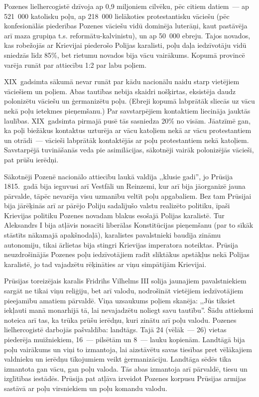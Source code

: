 \documentclass[twoside,a5paper,12pt,fleqn,openany]{extbook}
\begin{document}
Pozenes lielhercogistē dzīvoja ap 0,9 miljoniem cilvēku, pēc citiem datiem~--- ap 521~000 katolisku poļu, ap 218~000 lielākoties protestantisku vāciešu (pēc konfesionālās piederības Pozenes vāciešu vidū dominēja luterāņi, kaut pastāvēja arī maza grupiņa t.s. reformātu-kalvinistu), un ap 50~000 ebreju. Tajos novados, kas robežojās ar Krievijai piederošo Polijas karalisti, poļu daļa iedzīvotāju vidū sniedzās līdz 85\%, bet rietumu novados bija vācu vairākums. Kopumā provincē varēja runāt par attiecību 1:2 par labu poļiem.

XIX~gadsimta sākumā nevar runāt par kādu nacionālu naidu starp vietējiem vāciešiem un poļiem. Abas tautības nebija skaidri nošķirtas, eksistēja daudz polonizētu vāciešu un ģermanizētu poļu. (Ebreji kopumā labprātāk sliecās uz vācu nekā poļu ietekmes pieņemšanu.) Par savstarpējiem kontaktiem liecināja jauktās laulības. XIX~gadsimta pirmajā pusē tās sasniedza 20\% no visām. Jāatzīmē gan, ka poļi biežākus kontaktus uzturēja ar vācu katoļiem nekā ar vācu protestantiem un otrādi~--- vācieši labprātāk kontaktējās ar poļu protestantiem nekā katoļiem. Savstarpējā tuvināšanās veda pie asimilācijas, sākotnēji vairāk polonizējās vācieši, pat prūšu ierēdņi.

Sākotnēji Pozenē nacionālo attiecību laukā valdīja ,,klusie gadi'', jo Prūsija 1815.~gadā bija ieguvusi arī Vestfāli un Reinzemi, kur arī bija jāorganizē jauna pārvalde, tāpēc nevarēja visu uzmanību veltīt poļu apgabaliem. Bez tam Prūsijai bija jārēķinās arī ar pārējo Poliju sadalījušo valstu realizēto politiku, īpaši Krievijas politiku Pozenes novadam blakus esošajā Polijas karalistē. Tur Aleksandrs I bija atļāvis nosacīti liberālas Konstitūcijas pieņemšanu (par to sīkāk stāstīts nākamajā apakšnodaļā), karalistes pavalstnieki baudīja zināmu autonomiju, tikai ārlietas bija stingri Krievijas imperatora noteiktas. Prūsija neuzdrošinājās Pozenes poļu iedzīvotājiem radīt sliktākus apstākļus nekā Polijas karalistē, jo tad vajadzētu rēķināties ar viņu simpātijām Krievijai.

Prūsijas toreizējais karalis Fridrihs Vilhelms III solīja jaunajiem pavalstniekiem sargāt ne tikai viņu reliģiju, bet arī valodu, nodrošināt vietējiem iedzīvotājiem pieejamību amatiem pārvaldē. Viņa uzsaukums poļiem skanēja: ,,Jūs tiksiet iekļauti manā monarhijā tā, lai nevajadzētu noliegt savu tautību''. Šādu attieksmi noteica arī tas, ka trūka prūšu ierēdņu, kuri zinātu arī poļu valodu. Pozenes lielhercogistē darbojās pašvaldība: landtāgs. Tajā 24 (vēlāk~--- 26) vietas piederēja muižniekiem, 16~--- pilsētām un 8~--- lauku kopienām. Landtāgā bija poļu vairākums un viņi to izmantoja, lai aizstāvētu savas tiesības pret vēlākajiem valdnieku un ierēdņu tīkojumiem veikt ģermanizāciju. Landtāga sēdēs tika izmantota gan vācu, gan poļu valoda. Tās abas izmantoja arī pārvaldē, tiesu un izglītības iestādēs. Prūsija pat atļāva izveidot Pozenes korpusu Prūsijas armijas sastāvā ar poļu virsniekiem un poļu komandu valodu.
\end{document}
